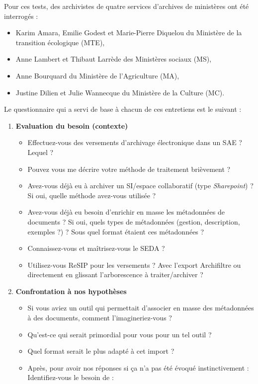 Pour ces tests, des archivistes de quatre services d’archives de ministères ont été interrogés : 
\begin{itemize}
	\item Karim Amara, Emilie Godest et Marie-Pierre Diquelou du Ministère de la transition écologique (MTE), 
	\item Anne Lambert et Thibaut Larrède des Ministères sociaux (MS), 
	\item Anne Bourquard du Ministère de l'Agriculture (MA),
	\item Justine Dilien et Julie Wannecque du Ministère de la Culture (MC).
\end{itemize}
Le questionnaire qui a servi de base à chacun de ces entretiens est le suivant : 
\begin{enumerate}
	\item \textbf{Evaluation du besoin (contexte)}
		\begin{itemize}
			\item Effectuez-vous des versements d’archivage électronique dans un \gls{SAE} ? Lequel ?
			\item Pouvez vous me décrire votre méthode de traitement brièvement ?
			\item Avez-vous déjà eu à archiver un \gls{SI}/espace collaboratif (type \textit{Sharepoint}) ? Si oui, quelle méthode avez-vous utilisée ?
			\item Avez-vous déjà eu besoin d’enrichir en masse les métadonnées de documents ? Si oui, quels types de métadonnées (gestion, description, exemples ?) ? Sous quel format étaient ces métadonnées ?
			\item Connaissez-vous et maîtrisez-vous le \gls{SEDA} ?
			\item Utilisez-vous ReSIP pour les versements ? Avec l’export \gls{Archifiltre} ou directement en glissant l’arborescence à traiter/archiver ?
		\end{itemize}
	\item \textbf{Confrontation à nos hypothèses}
	\begin{itemize}
		\item Si vous aviez un outil qui permettait d’associer en masse des métadonnées à des documents, comment l’imagineriez-vous ?
		\item Qu’est-ce qui serait primordial pour vous pour un tel outil ?
		\item Quel format serait le plus adapté à cet import ?
		\item Après, pour avoir nos réponses si ça n’a pas été évoqué instinctivement :  Identifiez-vous le besoin de :

\end{itemize}
\end{enumerate}
